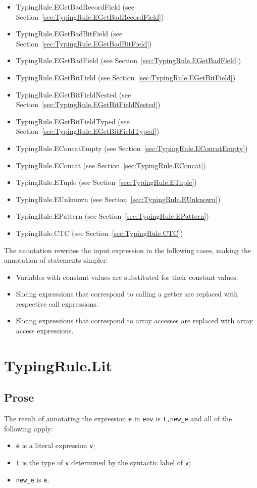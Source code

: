 \documentclass{book}
\begin{document}
\begin{itemize}
\item TypingRule.EGetBadRecordField (see Section~\ref{sec:TypingRule.EGetBadRecordField})
\item TypingRule.EGetBadBitField (see Section~\ref{sec:TypingRule.EGetBadBitField})
\item TypingRule.EGetBadField (see Section~\ref{sec:TypingRule.EGetBadField})
\item TypingRule.EGetBitField (see Section~\ref{sec:TypingRule.EGetBitField})
\item TypingRule.EGetBitFieldNested (see Section~\ref{sec:TypingRule.EGetBitFieldNested})
\item TypingRule.EGetBitFieldTyped (see Section~\ref{sec:TypingRule.EGetBitFieldTyped})
\item TypingRule.EConcatEmpty (see Section~\ref{sec:TypingRule.EConcatEmpty})
\item TypingRule.EConcat (see Section~\ref{sec:TypingRule.EConcat})
\item TypingRule.ETuple (see Section~\ref{sec:TypingRule.ETuple})
\item TypingRule.EUnknown (see Section~\ref{sec:TypingRule.EUnknown})
\item TypingRule.EPattern (see Section~\ref{sec:TypingRule.EPattern})
\item TypingRule.CTC (see Section~\ref{sec:TypingRule.CTC})
\end{itemize}

The annotation rewrites the input expression in the following cases, making the annotation of statements simpler:
\begin{itemize}
  \item Variables with constant values are substituted for their constant values.
  \item Slicing expressions that correspond to calling a getter are replaced with respective call expressions.
  \item Slicing expressions that correspond to array accesses are replaced with array access expressions.
\end{itemize}

\section{TypingRule.Lit \label{sec:TypingRule.Lit}}

  \subsection{Prose}
  The result of annotating the expression \texttt{e} in \texttt{env} is
\texttt{t,new\_e} and all of the following apply:
  \begin{itemize}
  \item \texttt{e} is a literal expression \texttt{v};
  \item \texttt{t} is the type of \texttt{v} determined by the syntactic label of \texttt{v};
  \item \texttt{new\_e} is \texttt{e}.
  \end{itemize}
\end{document}

